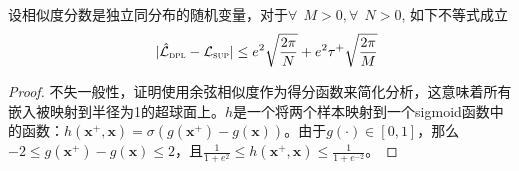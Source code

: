 \begin{lemma}\label{lemma:err}
设相似度分数是独立同分布的随机变量，对于$\forall~~M>0,\forall~~N>0$, 如下不等式成立
	\begin{eqnarray}
		&&|\hat{\mathcal{L}}_\textsc{dpl}-\mathcal{L}_\textsc{sup}| \leq \nonumber e^2\sqrt{\frac{2\pi}{N}} + e^2\tau^+\sqrt{\frac{2\pi}{M}}
	\end{eqnarray}
	\begin{proof}
不失一般性，证明使用余弦相似度作为得分函数来简化分析，这意味着所有嵌入被映射到半径为1的超球面上。$h$是一个将两个样本映射到一个sigmoid函数中的函数：$h(\mathbf{x}^+,\mathbf{x}) = \sigma (g(\mathbf{x}^+)- g(\mathbf{x}))$。由于$g(\cdot) \in [0,1]$，那么$-2 \leq g(\mathbf{x}^+)- g(\mathbf{x}) \leq 2$，且$ \frac{1}{1+e^{2}} \leq h(\mathbf{x}^+,\mathbf{x}) \leq \frac{1}{1+e^{-2}} $。	
		

\end{proof}
\end{lemma}
